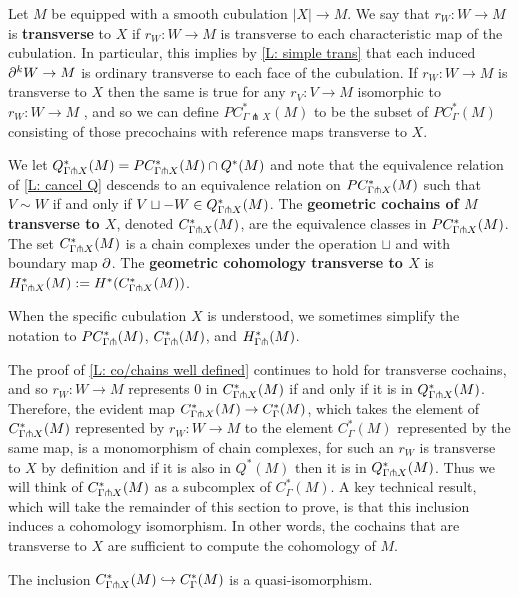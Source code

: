 \begin{definition}
Let $M$ be equipped with a smooth cubulation $|X| \to M$. We say that $r_W:W\to M$ is \textbf{transverse} to $X$ if $r_W: W\to M$ is transverse to each characteristic map of the cubulation. In particular, this implies by \cref{L: simple trans} that each induced $\partial^kW\to M$ is ordinary transverse to each face of the cubulation. If $r_W:W\to M$ is transverse to $X$ then the same is true for any $r_V:V\to M$ isomorphic to $r_W:W\to M$ , and so we can define $PC^*_{\Gamma \pitchfork X}(M)$ to be the subset of $PC^*_{\Gamma}(M)$ consisting of those precochains with reference maps transverse to $X$. 

We let $Q^*_{\Gamma \pitchfork X}(M)=PC_{\Gamma\pitchfork X}^*(M)\cap Q^*(M)$ and note that the equivalence relation of \cref{L: cancel Q} descends to an equivalence relation on  $PC_{\Gamma\pitchfork X}^*(M)$ such that $V\sim W$ if and only if $V\sqcup -W\in Q^*_{\Gamma \pitchfork X}(M)$. The \textbf{geometric cochains of $M$ transverse to $X$}, denoted $C_{\Gamma\pitchfork X}^*(M)$, are the equivalence classes in $PC_{\Gamma\pitchfork X}^*(M)$. The set $C_{\Gamma\pitchfork X}^*(M)$ is a chain complexes under the operation $\sqcup$ and with boundary map $\partial$. The \textbf{geometric cohomology transverse to $X$} is $H_{\Gamma\pitchfork X}^*(M):=H^*(C_{\Gamma\pitchfork X}^*(M))$. 

When the specific cubulation $X$ is understood, we sometimes simplify the notation to $PC_{\Gamma\pitchfork}^*(M)$, $C_{\Gamma\pitchfork}^*(M)$, and $H_{\Gamma\pitchfork}^*(M)$.
\end{definition}


The proof of \cref{L: co/chains well defined} continues to hold for transverse cochains, and so $r_W:W\to M$ represents $0$ in $C^*_{\Gamma\pitchfork X}(M)$ if and only if it is in $Q^*_{\Gamma \pitchfork X}(M)$. Therefore, the evident map $C^*_{\Gamma\pitchfork X}(M)\to C^*_\Gamma(M)$, which takes the element of $C^*_{\Gamma\pitchfork X}(M)$ represented by $r_W:W\to M$ to the element $C^*_\Gamma(M)$ represented by the same map, is a monomorphism of chain complexes, for such an $r_W$ is transverse to $X$ by definition and if it is also in $Q^*(M)$ then it is  in $Q^*_{\Gamma \pitchfork X}(M)$. Thus we will think of  $C^*_{\Gamma\pitchfork X}(M)$ as a subcomplex of $C^*_\Gamma(M)$.
A key technical result, which will take the remainder of this section to prove, 
is that this inclusion induces a cohomology isomorphism. In other words, the cochains that are transverse to $X$ are sufficient to compute the cohomology of $M$.

\begin{theorem} \label{T: transverse complex}
The inclusion $C^*_{\Gamma \pitchfork X}(M)\hookrightarrow C^*_\Gamma(M)$ is a quasi-isomorphism.
\end{theorem}


